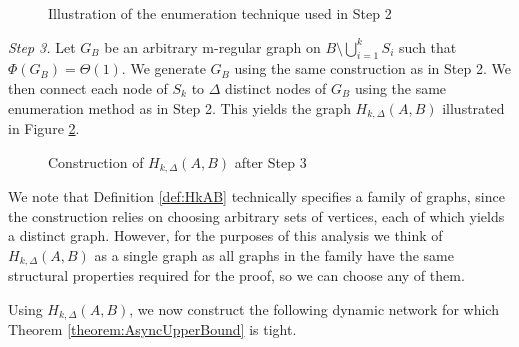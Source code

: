 \begin{definition}
    \begin{figure}[h]
        \centering
        
        \caption{Illustration of the enumeration technique used in Step 2}
        \label{fig:HkAB_2}
    \end{figure}


	\textit{Step 3.} Let $G_B$ be an arbitrary m-regular graph on $B \setminus \bigcup_{i=1}^k S_i$ such that $\Phi(G_B) = \Theta(1)$. 
	We generate $G_B$ using the same construction as in Step 2. We then connect each node of $S_k$ to $\Delta$ distinct nodes of $G_B$ using the same enumeration method as in Step 2. This yields the graph $H_{k, \Delta}(A,B)$ illustrated in Figure \ref{fig:HkAB_3}.

    \begin{figure}[h]
        \centering
        
        \caption{Construction of $H_{k, \Delta}(A,B)$ after Step 3}
        \label{fig:HkAB_3}
    \end{figure}


\end{definition}

We note that Definition \ref{def:HkAB} technically specifies a family of graphs, since the construction relies on choosing arbitrary sets of vertices, each of which yields a distinct graph. However, for the purposes of this analysis we think of $H_{k, \Delta}(A,B)$ as a single graph as all graphs in the family have the same structural properties required for the proof, so we can choose any of them. %

Using $H_{k, \Delta}(A,B)$, we now construct the following dynamic network for which Theorem \ref{theorem:AsyncUpperBound} is tight.


